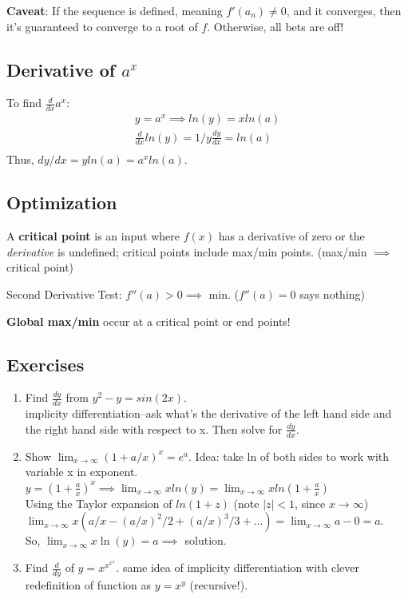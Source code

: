 \documentclass[a4paper, 12pt]{article}
\newcommand{\bt}[1]{\textbf{#1}} %
\newcommand{\eq}[1]{\begin{align*}#1\end{align*}} %
\renewcommand{\eq}[1]{\begin{align*}#1\end{align*}} %
\newcommand{\green}[1]{\textcolor{javagreen}{#1}} %
\newcommand{\gray}[1]{\textcolor[gray]{0.5}{#1}} %
\begin{document}
\bt{Caveat}: If the sequence is defined, meaning $f'(a_n) \neq 0$, and it converges, then it's guaranteed to converge to a root of $f$. Otherwise, all bets are off!


\subsection*{Derivative of $a^x$}

To find $\frac{d}{dx} a^x$: 
\eq{
y = a^x \implies ln(y) = x ln(a) \\
\frac{d}{dx} ln(y) = 1/y \frac{dy}{dx} = ln(a) \\
}
Thus, $dy/dx = y ln(a) = a^x ln(a).$

\subsection{Optimization}

A \bt{critical point} is an input where $f(x)$ has a derivative of zero or the \textit{derivative} is undefined; critical points include max/min points.
(max/min $\implies$ critical point)

Second Derivative Test: $f''(a) > 0 \implies$ min. ($f''(a) =0$ says nothing)

\bt{Global max/min} occur at a critical point or end points!


\subsection*{\green{Exercises}}
\begin{enumerate}
    \item Find $\frac{dy}{dx}$ from $y^2 - y = sin(2x)$.\\
    \gray{implicity differentiation--ask what's the derivative of the left hand side and the right hand side with respect to x. Then solve for $\frac{dy}{dx}$.}
    \item Show $\lim_{x \rightarrow \infty} (1 + a/x)^x = e^a$.
    \gray{Idea: take ln of both sides to work with variable x in exponent. \\
    $ y = (1 + \frac{a}{x})^x \implies \lim_{x \rightarrow \infty} 
    x ln(y) = \lim_{x \rightarrow \infty} x ln(1 + \frac{a}{x})$ \\
    Using the Taylor expansion of $ln(1 + z)$ (note $|z| < 1$, since $x \rightarrow
    \infty$)\\
    $\lim_{x \rightarrow \infty} x(a/x - (a/x)^2 / 2 + (a/x)^3 / 3 + \dots)
    = \lim_{x \rightarrow \infty} a - 0 = a.$\\
    So, $\lim_{x \rightarrow \infty} x \ln(y) = a \implies$ solution.
    }
    \item Find $\frac{d}{dy}$ of $y = x^{x^{x^{x}}}$.
    \gray{same idea of implicity differentiation with clever redefinition of
    function as $y = x^y$ (recursive!).
    }
\end{enumerate}
\end{document}
